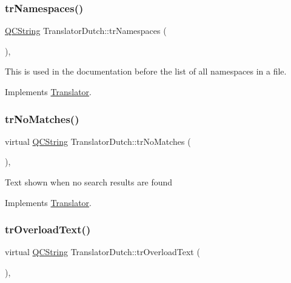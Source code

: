 \mbox{\label{class_translator_dutch_a7a1f8dcd415994a6f0b6441632a4b0ec}} 
\subsubsection{\texorpdfstring{trNamespaces()}{trNamespaces()}}
{\footnotesize\ttfamily \mbox{\hyperlink{class_q_c_string}{Q\+C\+String}} Translator\+Dutch\+::tr\+Namespaces (\begin{DoxyParamCaption}{ }\end{DoxyParamCaption})\hspace{0.3cm}{\ttfamily [inline]}, {\ttfamily [virtual]}}

This is used in the documentation before the list of all namespaces in a file. 

Implements \mbox{\hyperlink{class_translator}{Translator}}.

\mbox{\label{class_translator_dutch_a6398b14c41888622c97f15957c609141}} 
\subsubsection{\texorpdfstring{trNoMatches()}{trNoMatches()}}
{\footnotesize\ttfamily virtual \mbox{\hyperlink{class_q_c_string}{Q\+C\+String}} Translator\+Dutch\+::tr\+No\+Matches (\begin{DoxyParamCaption}{ }\end{DoxyParamCaption})\hspace{0.3cm}{\ttfamily [inline]}, {\ttfamily [virtual]}}

Text shown when no search results are found 

Implements \mbox{\hyperlink{class_translator}{Translator}}.

\mbox{\label{class_translator_dutch_a996a6c89701df9c58ecaec5afef90d67}} 
\subsubsection{\texorpdfstring{trOverloadText()}{trOverloadText()}}
{\footnotesize\ttfamily virtual \mbox{\hyperlink{class_q_c_string}{Q\+C\+String}} Translator\+Dutch\+::tr\+Overload\+Text (\begin{DoxyParamCaption}{ }\end{DoxyParamCaption})\hspace{0.3cm}{\ttfamily [inline]}, {\ttfamily [virtual]}}

